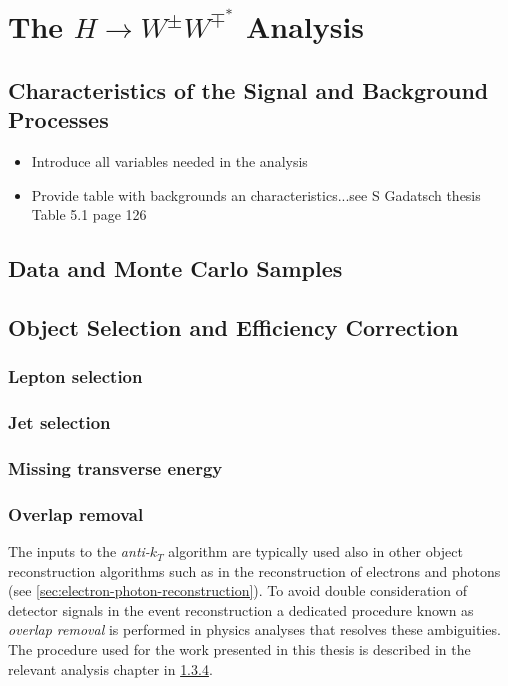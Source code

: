 \chapter{The $H\rightarrow W^{\pm}W^{\mp^*}$ Analysis}
\label{chap:hww}


\section{Characteristics of the Signal and Background Processes}
\begin{itemize}
    \item Introduce all variables needed in the analysis
    \item Provide table with backgrounds an characteristics...see S Gadatsch thesis Table 5.1 page 126
\end{itemize}



\section{Data and Monte Carlo Samples}




\section{Object Selection and Efficiency Correction}
\subsection{Lepton selection}
\subsection{Jet selection}


\subsection{Missing transverse energy}
\subsection{Overlap removal}
\label{subsec:overlap-removal}

The inputs to the \emph{anti-$k_T$} algorithm are typically used also in other object reconstruction algorithms such as in the reconstruction of electrons and photons (see \cref{sec:electron-photon-reconstruction}).
To avoid double consideration of detector signals in the event reconstruction a dedicated procedure known as \emph{overlap removal} is performed in physics analyses that resolves these ambiguities. The procedure used for the work presented in this thesis is described in the relevant analysis chapter in \cref{subsec:overlap-removal}.


